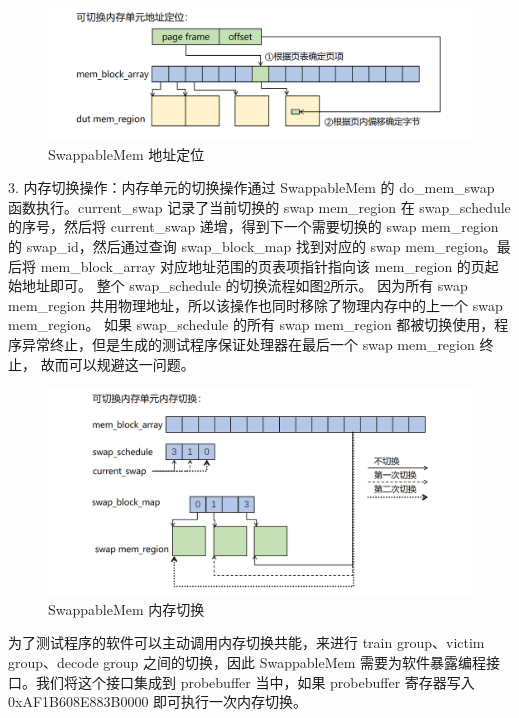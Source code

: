 \begin{figure}[!h]
    \centering
    \includegraphics[width=\linewidth]{figure/paper/swap-mem-addr.png}
    \caption{SwappableMem 地址定位}
    \label{paper:swap-mem-addr}
\end{figure}

3. 内存切换操作：内存单元的切换操作通过 SwappableMem 的 do\_mem\_swap 函数执行。current\_swap 记录了当前切换的 swap mem\_region 在
swap\_schedule 的序号，然后将 current\_swap 递增，得到下一个需要切换的 swap mem\_region 的 swap\_id，然后通过查询 swap\_block\_map 
找到对应的 swap mem\_region。最后将 mem\_block\_array 对应地址范围的页表项指针指向该 mem\_region 的页起始地址即可。
整个 swap\_schedule 的切换流程如图\ref{paper:swap-mem-swap}所示。
因为所有 swap mem\_region 共用物理地址，所以该操作也同时移除了物理内存中的上一个 swap mem\_region。
如果 swap\_schedule 的所有 swap mem\_region 都被切换使用，程序异常终止，但是生成的测试程序保证处理器在最后一个 swap mem\_region 终止，
故而可以规避这一问题。\par

\begin{figure}[!h]
    \centering
    \includegraphics[width=\linewidth]{figure/paper/swap-mem-swap.png}
    \caption{SwappableMem 内存切换}
    \label{paper:swap-mem-swap}
\end{figure}

为了测试程序的软件可以主动调用内存切换共能，来进行 train group、victim group、decode group 之间的切换，因此
SwappableMem 需要为软件暴露编程接口。我们将这个接口集成到 probebuffer 当中，如果 probebuffer 寄存器写入 0xAF1B608E883B0000
即可执行一次内存切换。

